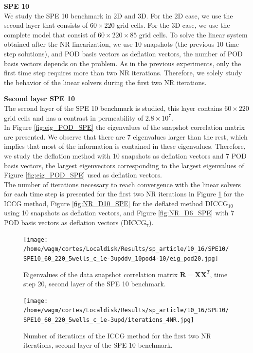\documentclass[12pt]{article}
\begin{document}
\newpage
\textbf{SPE 10}\\
We study the SPE 10 benchmark in 2D and 3D. For the 2D case, we use the second layer that consists of $60\times220$ grid cells. For the 3D case, we use the complete model that consist of $60\times220\times85$ grid cells. To solve the linear system obtained after the NR linearization, we use 10 snapshots (the previous 10 time step solutions), and POD basis vectors as deflation vectors, the number of POD basis vectors depends on the problem. As in the previous experiments, only the first time step requires more than two NR iterations. Therefore, we solely study the behavior of the linear solvers during the first two NR iterations. 

\textbf{Second layer SPE 10}\\
The second layer of the SPE 10 benchmark is studied, this layer contains $60\times 220$ grid cells and has a contrast in permeability of $2.8\times 10^{7}$.\\
In Figure \ref{fig:eig_POD_SPE} the eigenvalues of the snapshot correlation matrix are presented. We observe that there are 7 eigenvalues larger than the rest, which implies that most of the information is contained in these eigenvalues. Therefore, we study the deflation method with 10 snapshots as deflation vectors and 7 POD basis vectors, the largest eigenvectors corresponding to the largest eigenvalues of Figure \ref{fig:eig_POD_SPE} used as deflation vectors. \\
The number of iterations necessary to reach convergence with the linear solvers for each time step is presented for the first two NR iterations in Figure \ref{fig:NR_IC_SPE} for the ICCG method, Figure \ref{fig:NR_D10_SPE} for the deflated method DICCG$_{10}$ using 10 snapshots as deflation vectors, and Figure \ref{fig:NR_D6_SPE} with 7 POD basis vectors as deflation vectors (DICCG$_{7}$).

\begin{figure}[!ht]
\centering
\begin{minipage}{.4\textwidth}
 \centering
\texttt{[image: /home/wagm/cortes/Localdisk/Results/sp\_article/10\_16/SPE10/SPE10\_60\_220\_5wells\_c\_1e-3upddv\_10pod4-10/eig\_pod20.jpg]}
\caption{Eigenvalues of the data snapshot correlation matrix $\mathbf{R}=\mathbf{X}\mathbf{X}^T$, time step 20, second layer of the SPE 10 benchmark.}
\label{fig:eig_POD_SPE}
\end{minipage}%
\hspace{15mm}
\begin{minipage}{.4\textwidth}
\hspace{-1cm}
\texttt{[image: /home/wagm/cortes/Localdisk/Results/sp\_article/10\_16/SPE10/SPE10\_60\_220\_5wells\_c\_1e-3upd/iterations\_4NR.jpg]}
\vspace{-2cm}
\caption{Number of iterations of the ICCG method for the first two NR iterations, second layer of the SPE 10 benchmark.}
\label{fig:NR_IC_SPE}
\end{minipage}
\end{figure}
\end{document}
